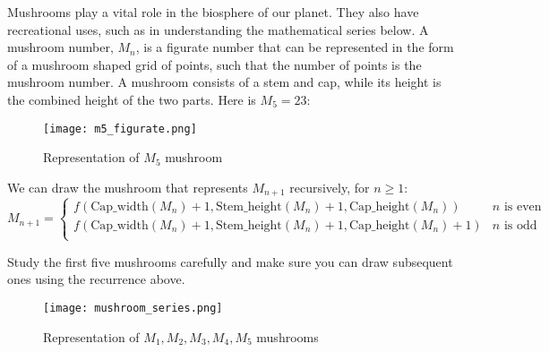 \documentclass[addpoints]{exam}
\begin{document}
\begin{questions}
\question Mushrooms play a vital role in the biosphere of our planet. They also have recreational uses, such as in understanding the mathematical series below. A mushroom number, $M_n$, is a figurate number that can be represented in the form of a mushroom shaped grid of points, such that the number of points is the mushroom number. A mushroom consists of a stem and cap, while its height is the combined height of the two parts. Here is $M_5=23$:

\begin{figure}[h]
  \centering
  \texttt{[image: m5\_figurate.png]}
  \caption{Representation of $M_5$ mushroom}
  \label{fig:mushroom_anatomy}
\end{figure}

We can draw the mushroom that represents $M_{n+1}$ recursively, for $n \geq 1$:
\[ 
    M_{n+1}=
    \begin{cases} 
      f(\textrm{Cap\_width}(M_n) + 1, \textrm{Stem\_height}(M_n) + 1, \textrm{Cap\_height}(M_n))  & n \textrm{ is even} \\
      f(\textrm{Cap\_width}(M_n) + 1, \textrm{Stem\_height}(M_n) + 1, \textrm{Cap\_height}(M_n)+1) & n \textrm{ is odd}  \\      
   \end{cases}
\]

Study the first five mushrooms carefully and make sure you can draw subsequent ones using the recurrence above.

\begin{figure}[h]
  \centering
  \texttt{[image: mushroom\_series.png]}
  \caption{Representation of $M_1,M_2,M_3,M_4,M_5$ mushrooms}
  \label{fig:mushroom_anatomy}
\end{figure}

\end{questions}
\end{document}
